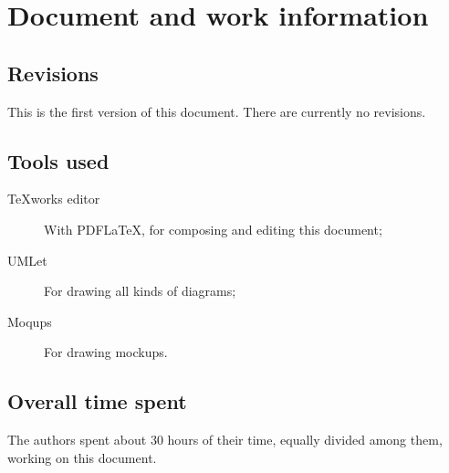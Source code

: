 \chapter{Document and work information}

\section{Revisions}
This is the first version of this document. There are currently no revisions.

\section{Tools used}
\begin{description}
\item[TeXworks editor] With PDF\LaTeX{}, for composing and editing this document;
\item[UMLet] For drawing all kinds of diagrams;
\item[Moqups] For drawing mockups.
\end{description}

\section{Overall time spent}
The authors spent about 30 hours of their time, equally divided among them, working on this document.